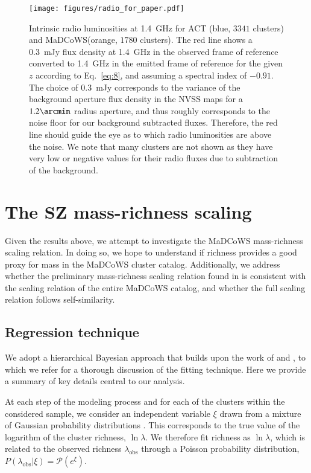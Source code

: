 \documentclass[longauth]{aa} %
\newcommand{\madcows}{MaDCoWS\xspace}
\begin{document}
\begin{figure}
    \centering
    \texttt{[image: figures/radio\_for\_paper.pdf]}
    \caption{Intrinsic radio luminosities at 1.4~GHz for ACT (blue, $3341$ clusters) and \madcows (orange, $1780$ clusters). The red line shows a 0.3~mJy flux density at 1.4~GHz in the observed frame of reference  converted to 1.4~GHz in the emitted frame of reference for the given $z$ according to Eq.~\ref{eq:8}, and assuming a spectral index of $-0.91$. The choice of 0.3~mJy corresponds to the variance of the background aperture flux density in the NVSS maps for a $1.2\arcmin$ radius aperture, and thus roughly corresponds to the noise floor for our background subtracted fluxes. Therefore, the red line should guide the eye as to which radio luminosities are above the noise. We note that many clusters are not shown as they have very low or negative values for their radio fluxes due to subtraction of the background. }
    \label{fig:radio_lum}
\end{figure}

\section{The SZ mass-richness scaling}\label{sec:scalingrels}
Given the results above, we attempt to investigate the \madcows mass-richness scaling relation. In doing so, we hope to understand if richness provides a good proxy for mass in the \madcows cluster catalog. Additionally, we address whether the preliminary mass-richness scaling relation found in \citet{Gonzalez2019} is consistent with the scaling relation of the entire \madcows catalog, and whether the full scaling relation follows self-similarity. 
\subsection{Regression technique}
\label{sec:regression}
We adopt a hierarchical Bayesian approach that builds upon the work of \citet{Kelly2007} and \citet{sereno2016}, to which we refer for a thorough discussion of the fitting technique. Here we provide a summary of key details central to our analysis.

At each step of the modeling process and for each of the clusters within the considered sample, we consider an independent variable $\xi$ drawn from a mixture of Gaussian probability distributions \citep{Kelly2007}. This corresponds to the true value of the logarithm of the cluster richness, $\ln{\lambda}$. We therefore fit richness as $\ln{\lambda}$, which is related to the observed richness $\lambda_{\mathrm{obs}}$ through a Poisson probability distribution, $P(\lambda_{\mathrm{obs}}|\xi) = \mathcal{P}(e^{\xi})$.
\end{document}
